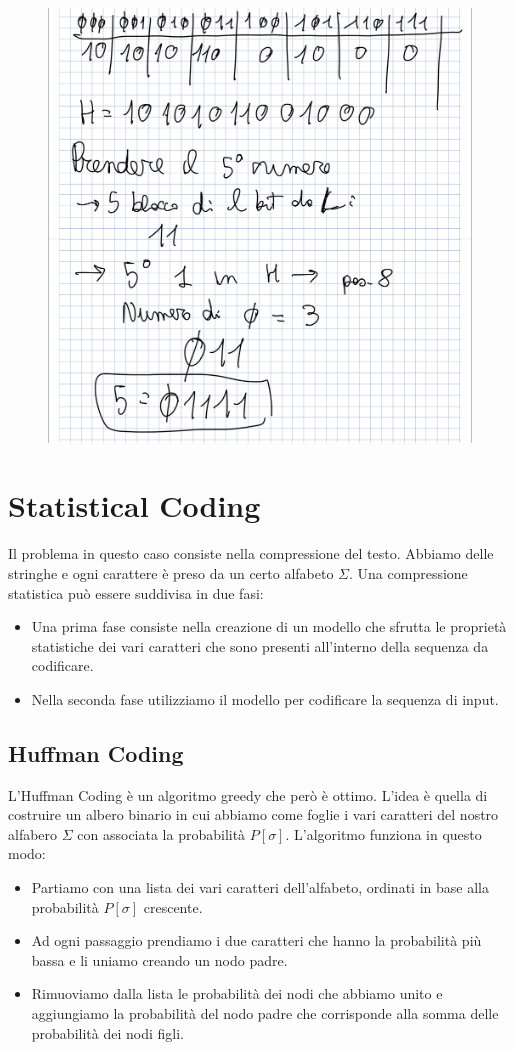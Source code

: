 \documentclass[14pt]{extreport}
\begin{document}
\begin{figure}[H]
\centering
  \includegraphics[width=0.7\linewidth]{EF2.jpg}
\end{figure}



\chapter{Statistical Coding}

Il problema in questo caso consiste nella compressione del testo. Abbiamo delle stringhe e ogni carattere è preso da un certo alfabeto $\Sigma$.
Una compressione statistica può essere suddivisa in due fasi:
\begin{itemize}
\item Una prima fase consiste nella creazione di un modello che sfrutta le proprietà statistiche dei vari caratteri che sono presenti all'interno della sequenza da codificare.
\item Nella seconda fase utilizziamo il modello per codificare la sequenza di input.
\end{itemize}

\section{Huffman Coding}

L'Huffman Coding è un algoritmo greedy che però è ottimo.
L'idea è quella di costruire un albero binario in cui abbiamo come foglie i vari caratteri del nostro alfabero $\Sigma$ con associata la probabilità $P[\sigma]$. 
L'algoritmo funziona in questo modo:
\begin{itemize}
\item Partiamo con una lista dei vari caratteri dell'alfabeto, ordinati in base alla probabilità $P[\sigma]$ crescente.
\item Ad ogni passaggio prendiamo i due caratteri che hanno la probabilità più bassa e li uniamo creando un nodo padre.
\item Rimuoviamo dalla lista le probabilità dei nodi che abbiamo unito e aggiungiamo la probabilità del nodo padre che corrisponde alla somma delle probabilità dei nodi figli.
\end{itemize}
\end{document}
